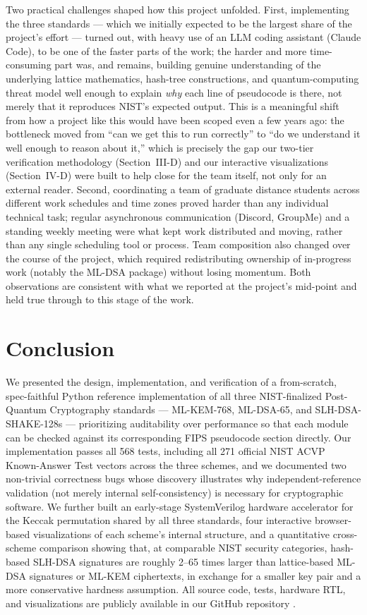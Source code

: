 \documentclass[10pt,conference]{IEEEtran}
\begin{document}
Two practical challenges shaped how this project unfolded. First,
implementing the three standards --- which we initially expected to be
the largest share of the project's effort --- turned out, with heavy use
of an LLM coding assistant (Claude Code), to be one of the faster parts
of the work; the harder and more time-consuming part was, and remains,
building genuine understanding of the underlying lattice mathematics,
hash-tree constructions, and quantum-computing threat model well enough
to explain \emph{why} each line of pseudocode is there, not merely that
it reproduces NIST's expected output. This is a meaningful shift from
how a project like this would have been scoped even a few years ago: the
bottleneck moved from ``can we get this to run correctly'' to ``do we
understand it well enough to reason about it,'' which is precisely the
gap our two-tier verification methodology (Section~III-D) and our
interactive visualizations (Section~IV-D) were built to help close for
the team itself, not only for an external reader. Second, coordinating a
team of graduate distance students across different work schedules and
time zones proved harder than any individual technical task; regular
asynchronous communication (Discord, GroupMe) and a standing weekly
meeting were what kept work distributed and moving, rather than any
single scheduling tool or process. Team composition also changed over
the course of the project, which required redistributing ownership of
in-progress work (notably the ML-DSA package) without losing momentum.
Both observations are consistent with what we reported at the project's
mid-point and held true through to this stage of the work.

\section{Conclusion}

We presented the design, implementation, and verification of a
from-scratch, spec-faithful Python reference implementation of all three
NIST-finalized Post-Quantum Cryptography standards --- ML-KEM-768,
ML-DSA-65, and SLH-DSA-SHAKE-128s --- prioritizing auditability over
performance so that each module can be checked against its corresponding
FIPS pseudocode section directly. Our implementation passes all 568
tests, including all 271 official NIST ACVP Known-Answer Test vectors
across the three schemes, and we documented two non-trivial correctness
bugs whose discovery illustrates why independent-reference validation
(not merely internal self-consistency) is necessary for cryptographic
software. We further built an early-stage SystemVerilog hardware
accelerator for the Keccak permutation shared by all three standards,
four interactive browser-based visualizations of each scheme's internal
structure, and a quantitative cross-scheme comparison showing that, at
comparable NIST security categories, hash-based SLH-DSA signatures are
roughly 2--65 times larger than lattice-based ML-DSA signatures or
ML-KEM ciphertexts, in exchange for a smaller key pair and a more
conservative hardness assumption. All source code, tests, hardware RTL,
and visualizations are publicly available in our GitHub repository
\cite{repo}.
\end{document}
